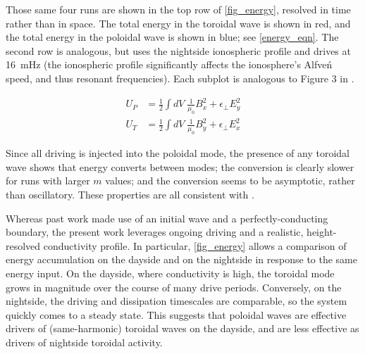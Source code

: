 \documentclass[draft,linenumbers]{agujournal}
\begin{document}
Those same four runs are shown in the top row of \cref{fig_energy}, resolved in time rather than in space. The total energy in the toroidal wave is shown in red, and the total energy in the poloidal wave is shown in blue; see \cref{energy_eqn}. The second row is analogous, but uses the nightside ionospheric profile and drives at \SI{16}{\mHz} (the ionospheric profile significantly affects the ionosphere's Alfve\'n speed, and thus resonant frequencies). Each subplot is analogous to Figure 3 in \citet{mann_1995}.
\begin{linenomath*}
\begin{align}
  \label{energy_eqn}
    U_P &= \frac{1}{2} \displaystyle\int dV \; \frac{1}{\mu_0} B_x^2 + \epsilon_\bot E_y^2 \\
    U_T &= \frac{1}{2} \displaystyle\int dV \; \frac{1}{\mu_0} B_y^2 + \epsilon_\bot E_x^2
\end{align}
\end{linenomath*}

Since all driving is injected into the poloidal mode, the presence of any toroidal wave shows that energy converts between modes; the conversion is clearly slower for runs with larger $m$ values; and the conversion seems to be asymptotic, rather than oscillatory. These properties are all consistent with \citet{mann_1995}.

Whereas past work made use of an initial wave and a perfectly-conducting boundary, the present work leverages ongoing driving and a realistic, height-resolved conductivity profile. In particular, \cref{fig_energy} allows a comparison of energy accumulation on the dayside and on the nightside in response to the same energy input. On the dayside, where conductivity is high, the toroidal mode grows in magnitude over the course of many drive periods. Conversely, on the nightside, the driving and dissipation timescales are comparable, so the system quickly comes to a steady state. This suggests that poloidal waves are effective drivers of (same-harmonic) toroidal waves on the dayside, and are less effective as drivers of nightside toroidal activity.
\end{document}
